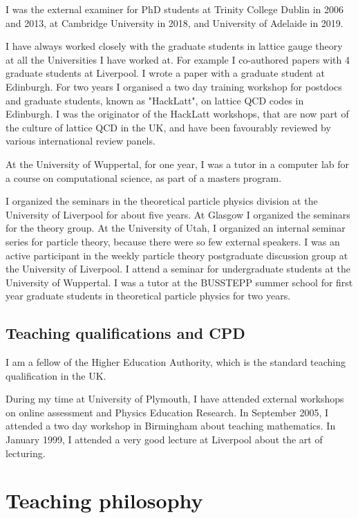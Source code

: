 \documentclass[12pt]{article}
\begin{document}
I was the external examiner for PhD students
at Trinity College Dublin in 2006 and 2013,
at Cambridge University in 2018,
and University of Adelaide in 2019.   


I have always worked closely with the graduate students in lattice
gauge theory at all the Universities I have worked at.  For example I
co-authored papers with 4 graduate students at Liverpool. I wrote a
paper with a graduate student at Edinburgh.  For two years I organised
a two day training workshop for postdocs and graduate students, known
as "HackLatt", on lattice QCD codes in Edinburgh. I was the originator
of the HackLatt workshops, that are now part of the culture of lattice
QCD in the UK, and have been favourably reviewed by various
international review panels.


At the University of Wuppertal, for one year, I was a tutor in
a computer lab for a course on computational 
science, as part of a masters program.


I organized the seminars in the theoretical particle physics division
at the University of Liverpool for about five years. At Glasgow I
organized the seminars for the theory group.  At the University of
Utah, I organized an internal seminar series for particle theory,
because there were so few external speakers.
I was an active
participant in the weekly particle theory postgraduate discussion
group at the University of Liverpool.
I attend a seminar for undergraduate students at the University
of Wuppertal.
I was a tutor at the BUSSTEPP summer school for first year
graduate students in theoretical particle physics for two years.



\subsection{Teaching qualifications and CPD}

I am a fellow of the Higher Education Authority, which is the standard  teaching
qualification in the UK.

During my time at University of Plymouth, I have attended external workshops on online
assessment and Physics Education Research.  In September 2005, I
attended a two day workshop in Birmingham about teaching
mathematics. In January 1999, I attended a very good lecture at
Liverpool about the art of lecturing.


\section{Teaching philosophy} 
\end{document}
